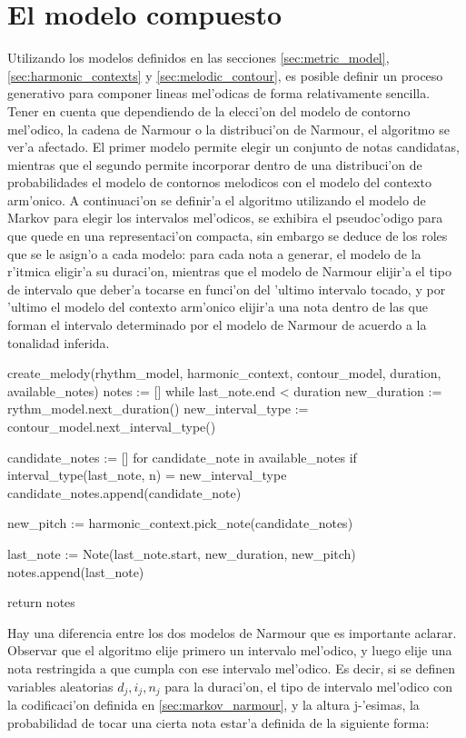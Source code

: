 \section{El modelo compuesto}
Utilizando los modelos definidos en las secciones \ref{sec:metric_model}, \ref{sec:harmonic_contexts} y \ref{sec:melodic_contour}, es posible definir
un proceso generativo para componer lineas mel'odicas de forma relativamente sencilla. 
Tener en cuenta que dependiendo de la elecci'on del modelo de contorno mel'odico, la cadena de Narmour o la distribuci'on de Narmour, el algoritmo se ver'a
afectado. El primer modelo permite elegir un conjunto de notas candidatas, mientras que el segundo permite incorporar dentro de una distribuci'on de 
probabilidades el modelo de contornos melodicos con el modelo del contexto arm'onico. 
A continuaci'on se definir'a el algoritmo utilizando el modelo de Markov para elegir los intervalos mel'odicos, se exhibira el pseudoc'odigo 
para que quede en una representaci'on compacta, sin embargo se deduce de los roles que se le asign'o a cada modelo: 
para cada nota a generar, el modelo de la r'itmica eligir'a su duraci'on, mientras que el modelo de Narmour elijir'a el tipo de intervalo que deber'a 
tocarse en funci'on del 'ultimo intervalo tocado, y por 'ultimo el modelo del contexto arm'onico elijir'a una nota dentro de las que forman 
el intervalo determinado por el modelo de Narmour de acuerdo a la tonalidad inferida.

\begin{algoritmo}
create_melody(rhythm_model, harmonic_context, contour_model, duration, available_notes)
    notes := []
    while last_note.end < duration
        new_duration := rythm_model.next_duration()
        new_interval_type := contour_model.next_interval_type()

        candidate_notes := []
        for candidate_note in available_notes
            if interval_type(last_note, n) = new_interval_type
                candidate_notes.append(candidate_note)

        new_pitch := harmonic_context.pick_note(candidate_notes)

        last_note := Note(last_note.start, new_duration, new_pitch)
        notes.append(last_note) 

    return notes
\end{algoritmo}

Hay una diferencia entre los dos modelos de Narmour que es importante aclarar. Observar que el algoritmo elije primero un intervalo mel'odico, y luego
elije una nota restringida a que cumpla con ese intervalo mel'odico. Es decir, si se definen variables aleatorias $d_j, i_j, n_j$ para la duraci'on, 
el tipo de intervalo mel'odico con la codificaci'on definida en \ref{sec:markov_narmour}, y la altura j-'esimas, la probabilidad de tocar una cierta nota estar'a definida de la siguiente forma:

